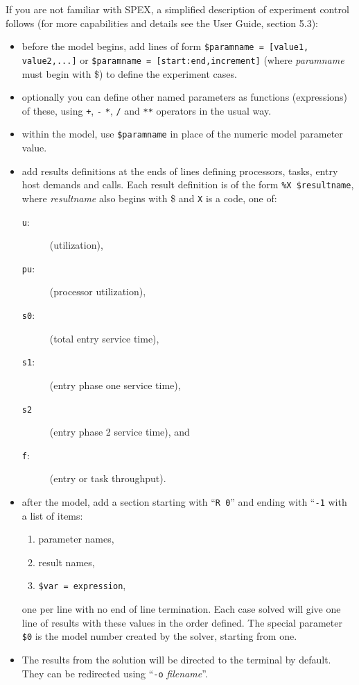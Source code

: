 \documentclass[11pt]{article}
\makeatletter
\newcommand{\parameter}[1]{\texttt{#1}\index{#1@\texttt{#1}}}
\makeatother
\begin{document}
\begin{enumerate}
  If you are not familiar with SPEX, a simplified description of experiment control follows (for more
  capabilities and details see the User Guide, section 5.3):
  \begin{itemize}
  \item before the model begins, add lines of form \verb!$paramname = [value1, value2,...]! or \verb!$paramname = [start:end,increment]! 
    (where \emph{paramname} must begin with \$) to define the experiment cases.
  \item optionally you can define other named parameters as
    functions (expressions) of these, using \texttt{+}, \texttt{-}
    \texttt{*}, \texttt{/} and \texttt{**} operators in the usual way.
  \item within the model, use \verb!$paramname! in place of the numeric model parameter value.
  \item add results definitions at the ends of lines defining processors, tasks, entry host demands and
    calls. Each result definition is of the form \verb!%X $resultname!, where \emph{resultname} also begins with \$
    and \texttt{X} is a code, one of:
    \begin{description}
    \item[\parameter{u}:] (utilization), 
    \item[\parameter{pu}:] (processor utilization),
    \item[\parameter{s0}:] (total entry service time), 
    \item[\parameter{s1}:] (entry phase one service time), 
    \item[\parameter{s2}] (entry phase 2 service time), and
    \item[\parameter{f}:] (entry or task throughput).
    \end{description}
  \item after the model, add a section starting with ``\verb!R 0!''
    and ending with ``\verb!-1! with a list of items:
    \begin{enumerate}
    \item parameter names, 
    \item result names,
    \item \verb!$var = expression!,
    \end{enumerate}
    one per line with no end of line termination.   Each case solved will give one line of results with these values in the order defined.
    The special parameter \verb!$0! is the model number created by the solver, starting from one.
  \item The results from the solution will be directed to the terminal
    by default.  They can be redirected using ``\verb!-o!
    \emph{filename}''. 
  \end{itemize}
\end{enumerate}
\end{document}

